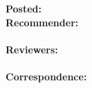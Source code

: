 {\begin{flushleft}
{\vspace*{0.5cm}
\textbf{Posted:} \datepub\\
\vspace*{0.5cm}
\textbf{Recommender:}\\
\recommender\\
\vspace*{0.5cm}
\textbf{Reviewers:}\\
\reviewers\\
\vspace*{0.5cm}
\textbf{Correspondence:}\\
\href{mailto:\email}{\email}\\


}
{\Huge
{}\selectfont{\preprinttitle}}
\end{flushleft}
\vspace*{0.25cm}
\begin{flushleft}




\Large
\listauthors
\end{flushleft}
\bigskip
{\raggedright
\listinstitutions}
{\raggedright
\authorshipnotes}

}
